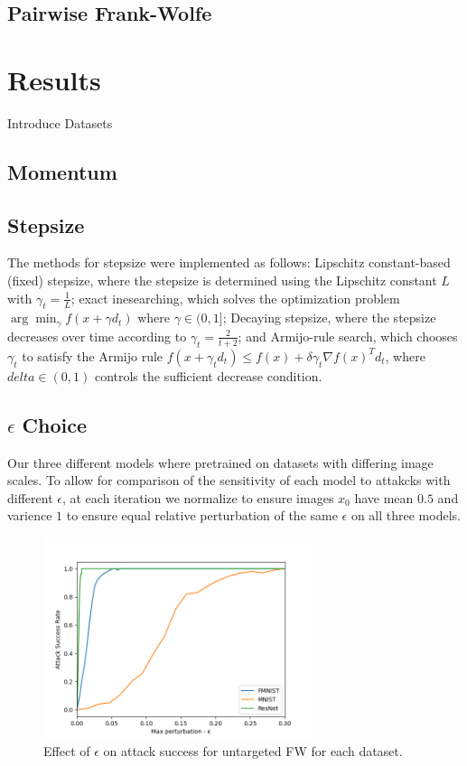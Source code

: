\documentclass{article}
\begin{document}
\subsection{Pairwise Frank-Wolfe}

\section{Results}
Introduce Datasets
\subsection{Momentum}

\subsection{Stepsize}
The methods for stepsize were implemented as follows: Lipschitz constant-based (fixed) stepsize, where the stepsize is determined using the Lipschitz constant \(L\) with \(\gamma_t = \frac{1}{L}\); exact inesearching, which solves the optimization problem \(\arg \min_{\gamma} f(x + \gamma d_t)\) where \(\gamma \in (0,1]\); Decaying stepsize, where the stepsize decreases over time according to \(\gamma_t = \frac{2}{t + 2}\); and Armijo-rule search, which chooses \(\gamma_t\) to satisfy the Armijo rule \(f(x + \gamma_t d_t) \leq f(x) + \delta \gamma_t \nabla f(x)^T d_t\), where \(delta \in (0,1)\) controls the sufficient decrease condition.

\subsection{$\epsilon$ Choice}
Our three different models where pretrained on datasets with differing image scales. To allow for comparison of the sensitivity of each model to attakcks with different $\epsilon$, at each iteration we normalize to ensure images $x_0$ have mean $0.5$ and varience $1$ to ensure equal relative perturbation of the same $\epsilon$ on all three models. 

\begin{figure}[H]
    \centering
    \includegraphics[width=0.7\textwidth]{plots/eps_choice.png}
    \caption{Effect of $\epsilon$ on attack success for untargeted FW for each dataset.}
    \label{fig:converge-compare}
\end{figure}
\end{document}
